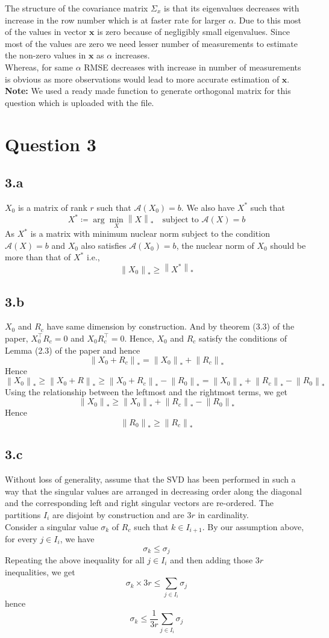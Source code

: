 \documentclass[12pt]{article}
\newcommand{\norm}[1]{\left\lVert #1 \right\rVert}
\newcommand{\A}{\mathcal{A}}
\begin{document}
The structure of the covariance matrix $\Sigma_x$ is that its eigenvalues decreases with increase in the row number which is at faster rate for larger $\alpha$. Due to this most of the values in vector $\boldsymbol{x}$ is zero because of negligibly small eigenvalues. Since most of the values are zero we need lesser number of measurements to estimate the non-zero values in $\boldsymbol{x}$ as $\alpha$ increases.\\
Whereas, for same $\alpha$ RMSE decreases with increase in number of measurements is obvious as more observations would lead to more accurate estimation of $\boldsymbol{x}$.\\
\textbf{Note:} We used a ready made function to generate orthogonal matrix for this question which is uploaded with the file.


\section*{Question 3}
\subsection*{3.a}
$X_0$  is a matrix of rank $r$ such that $\mathcal{A}(X_0) = b$. We also have $X^*$ such that
$$X^* \coloneqq \arg \min \limits_{X} \norm{X}_* \quad \text{subject to } \A(X) = b$$
As $X^*$ is a matrix with minimum nuclear norm subject to the condition $\A(X) = b$ and $X_0$ also satisfies $\A(X_0) = b$, the nuclear norm of $X_0$ should be more than that of $X^*$ i.e.,
$$\norm{X_0}_* \geq \norm{X^*}_*$$
\subsection*{3.b}
$X_0$ and $R_c$ have same dimension by construction. And by theorem (3.3) of the paper, $X_0^\intercal R_c = 0$ and $X_0R_c^\intercal = 0$. Hence, $X_0$ and $R_c$ satisfy the conditions of Lemma (2.3) of the paper and hence
$$\norm{X_0 + R_c}_* = \norm{X_0}_* + \norm{R_c}_*$$
Hence
$$\norm{X_0}_* \geq \norm{X_0 + R}_* \geq \norm{X_0 + R_c}_* - \norm{R_0}_* = \norm{X_0}_* + \norm{R_c}_* - \norm{R_0}_*$$
Using the relationship between the leftmost and the rightmost terms, we get
$$\norm{X_0}_* \geq \norm{X_0}_* + \norm{R_c}_* - \norm{R_0}_*$$
Hence
$$\norm{R_0}_* \geq \norm{R_c}_*$$
\subsection*{3.c}
Without loss of generality, assume that the SVD has been performed in such a way that the singular values are arranged in decreasing order along the diagonal and the corresponding left and right singular vectors are re-ordered. The partitions $I_i$ are disjoint by construction and are $3r$ in cardinality.\\
Consider a singular value $\sigma_k$ of $R_c$ such that $k \in I_{i+1}$. By our assumption above, for every $j \in I_i$, we have
$$\sigma_k \leq \sigma_j$$
Repeating the above inequality for all $j \in I_i$ and then adding those $3r$ inequalities, we get
$$\sigma_k \times 3r \leq \sum \limits_{j \in I_i}\sigma_j$$
hence
$$\sigma_k \leq \frac{1}{3r}\sum \limits_{j \in I_i}\sigma_j$$
\end{document}
